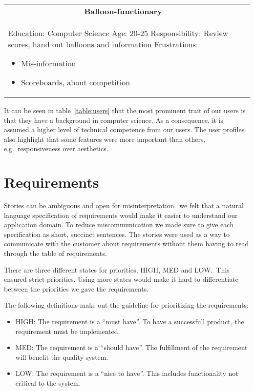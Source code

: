 \begin{longtable}{|m{2.9837599in}|m{3.1087599in}|}
\multicolumn{1}{|c|}{\textbf{Balloon-functionary}} \\
Education: Computer Science \newline
Age: 20-25 \newline
Responsibility: Review scores, hand out balloons and information \newline
Frustrations:
\begin{itemize}[nosep]
    \item Mis-information
    \item Scoreboards, about competition
\end{itemize}
\\
\hline
\end{longtable}

It can be seen in table~\ref{table:users} that the most prominent trait of our users is that
they have a background in computer science. As a consequence, it is assumed a
higher level of technical competence from our users. The user profiles also
highlight that some features were more important than others, e.g.\
responsiveness over aesthetics.

\section{Requirements}
Stories can be ambiguous and open for misinterpretation.\
we felt that a natural language specification of requirements would make it
easier to understand our application domain. To reduce miscommunication we made
sure to give each specification as short, succinct sentences. The stories were
used as a way to communicate with the customer about requirements without them
having to read through the table of requirements.

There are three different states for priorities, HIGH, MED and LOW.\
This ensured strict priorities.
Using more states would make it hard to differentiate between the priorities we
gave the requirements.

The following definitions make out the guideline for
prioritizing the requirements:
\begin{itemize}
    \item HIGH: The requirement is a ``must have''. To have a successfull product,
        the requirement must be implemented.
    \item MED: The requirement is a ``should have''. The fulfillment of the
        requirement will benefit the quality system.
    \item LOW: The requirement is a ``nice to have''. This includes functionality
        not critical to the system.
\end{itemize}

